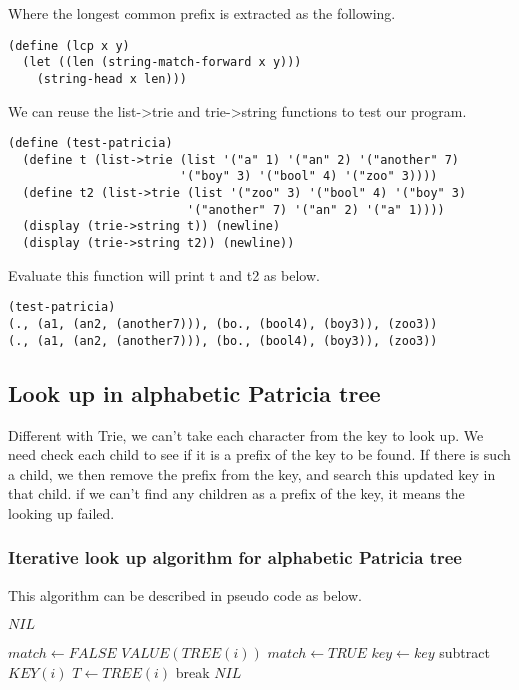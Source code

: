 \documentclass{article}
\begin{document}
Where the longest common prefix is extracted as the following.

\begin{lstlisting}
(define (lcp x y)
  (let ((len (string-match-forward x y)))
    (string-head x len)))
\end{lstlisting}

We can reuse the list->trie and trie->string functions to test our
program.

\begin{lstlisting}
(define (test-patricia)
  (define t (list->trie (list '("a" 1) '("an" 2) '("another" 7)
                        '("boy" 3) '("bool" 4) '("zoo" 3))))
  (define t2 (list->trie (list '("zoo" 3) '("bool" 4) '("boy" 3)
                         '("another" 7) '("an" 2) '("a" 1))))
  (display (trie->string t)) (newline)
  (display (trie->string t2)) (newline))
\end{lstlisting}

Evaluate this function will print t and t2 as below.

\begin{lstlisting}
(test-patricia)
(., (a1, (an2, (another7))), (bo., (bool4), (boy3)), (zoo3))
(., (a1, (an2, (another7))), (bo., (bool4), (boy3)), (zoo3))
\end{lstlisting}

\subsection{Look up in alphabetic Patricia tree}
Different with Trie, we can't take each character from the key to look up.
We need check each child to see if it is a prefix of the key to be found.
If there is such a child, we then remove the prefix from
the key, and search this updated key in that child. if we can't find any
children as a prefix of the key, it means the looking up failed.

\subsubsection{Iterative look up algorithm for alphabetic Patricia tree}

This algorithm can be described in pseudo code as below.
\begin{algorithmic}[1]
     \State \Return $NIL$ \EndIf

  \Repeat
    \State $match \leftarrow FALSE$
        \State \Return $VALUE(TREE(i))$
      \EndIf
        \State $match \leftarrow TRUE$
        \State $key \leftarrow key$ subtract $KEY(i)$
        \State $T \leftarrow TREE(i)$
        \State break
      \EndIf
    \EndFor
  \State \Return $NIL$
\EndFunction
\end{algorithmic}
\end{document}
